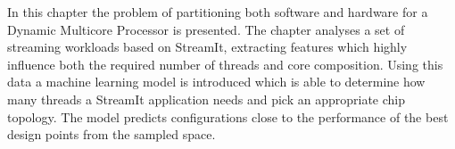 In this chapter the problem of partitioning both software and hardware for a Dynamic Multicore Processor is presented.
The chapter analyses a set of streaming workloads based on StreamIt, extracting features which highly influence both the required number of threads and core composition.
Using this data a machine learning model is introduced which is able to determine how many threads a StreamIt application needs and pick an appropriate chip topology.
The model predicts configurations close to the performance of the best design points from the sampled space.
